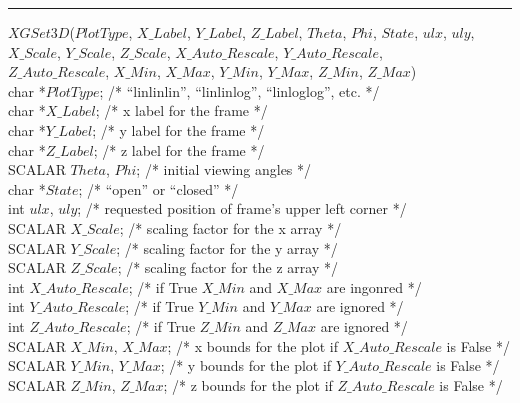 \def\xlen{4in}
\begin{minipage}{\xlen}
\begin{flushright}
\rule{\xlen}{.5pt}
\end{flushright}
\end{minipage}

\begin{flushleft}
$XGSet3D$($PlotType$, $X\_Label$, $Y\_Label$, $Z\_Label$, $Theta$, $Phi$, $State$, $ulx$, $uly$, \\
\hspace{.8in} $X\_Scale$, $Y\_Scale$, $Z\_Scale$, $X\_Auto\_Rescale$, $Y\_Auto\_Rescale$, \\
\hspace{.8in} $Z\_Auto\_Rescale$, $X\_Min$, $X\_Max$, $Y\_Min$, $Y\_Max$, $Z\_Min$, $Z\_Max$) \\
char  *$PlotType$;          /* ``linlinlin'', ``linlinlog'', ``linloglog'', etc. */ \\
char  *$X\_Label$;           /* x label for the frame                            */ \\
char  *$Y\_Label$;           /* y label for the frame                            */ \\
char  *$Z\_Label$;           /* z label for the frame                            */ \\
SCALAR  $Theta$, $Phi$;       /* initial viewing angles                           */ \\
char  *$State$;             /* ``open'' or ``closed''                            */ \\
int    $ulx$, $uly$;        /* requested position of frame's upper left corner    */ \\
SCALAR  $X\_Scale$;           /* scaling factor for the x array                   */ \\
SCALAR  $Y\_Scale$;           /* scaling factor for the y array                   */ \\
SCALAR  $Z\_Scale$;           /* scaling factor for the z array                   */ \\
int    $X\_Auto\_Rescale$;    /* if True $X\_Min$ and $X\_Max$ are ingonred      */ \\
int    $Y\_Auto\_Rescale$;    /* if True $Y\_Min$ and $Y\_Max$ are ignored       */ \\
int    $Z\_Auto\_Rescale$;    /* if True $Z\_Min$ and $Z\_Max$ are ignored       */ \\
SCALAR  $X\_Min$, $X\_Max$;    /* x bounds for the plot if $X\_Auto\_Rescale$ is False  */ \\
SCALAR  $Y\_Min$, $Y\_Max$;    /* y bounds for the plot if $Y\_Auto\_Rescale$ is False  */ \\
SCALAR  $Z\_Min$, $Z\_Max$;    /* z bounds for the plot if $Z\_Auto\_Rescale$ is False  */
\end{flushleft}


